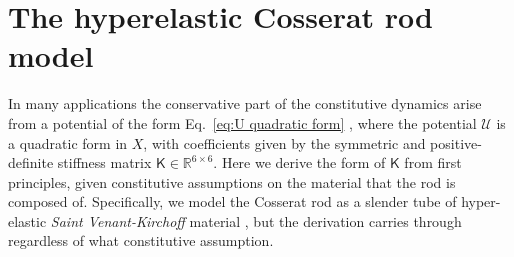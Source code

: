 \section{The hyperelastic Cosserat rod model} \label{sec:The hyperelastic Cosserat rod model}

In many applications the conservative part of the constitutive dynamics arise from a potential of the form Eq.~\ref{eq:U quadratic form} \citep{NonlinearProblemsElasticity2005, wangOptimalControlSoft2021a, gargSlenderBodyTheory2022, tillRealtimeDynamicsSoft2019}, where the potential $\mathcal{U}$ is a quadratic form in $X$, with coefficients given by the symmetric and positive-definite stiffness matrix $\mathsf{K} \in \mathbb{R}^{6 \times 6}$. Here we derive the form of $\mathsf{K}$ from first principles, given constitutive assumptions on the material that the rod is composed of. Specifically, we model the Cosserat rod as a slender tube of hyper-elastic \textit{Saint Venant-Kirchoff} material \cite{basarNonlinearContinuumMechanics2013}, but the derivation carries through regardless of what constitutive assumption.

